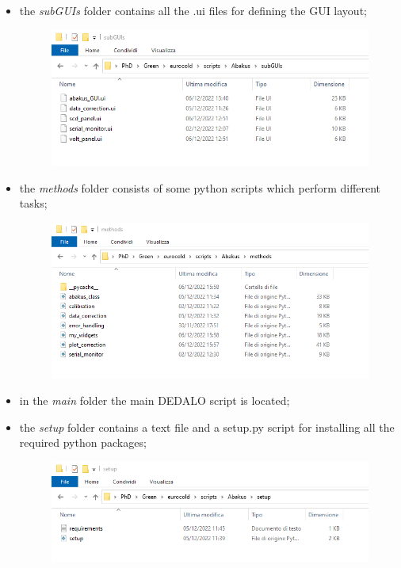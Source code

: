 \documentclass[a4paper, 11pt]{report}
\begin{document}
\begin{itemize}
\item the \textit{subGUIs} folder contains all the .ui files for defining the GUI layout;
\begin{figure}[!htb]
	\centering
	\includegraphics[scale=0.77]{folder_1.png}
\end{figure}
\item the \textit{methods} folder consists of some python scripts which perform different tasks;
\begin{figure}[!htb]
	\centering
	\includegraphics[scale=0.77]{folder_2.png}
\end{figure}
\item in the \textit{main} folder the main DEDALO script is located;
\item the \textit{setup} folder contains a text file and a setup.py script for installing all the required python packages;
\begin{figure}[!htb]
	\centering
	\includegraphics[scale=0.77]{folder_3.png}

\end{figure}
\end{itemize}
\end{document}
